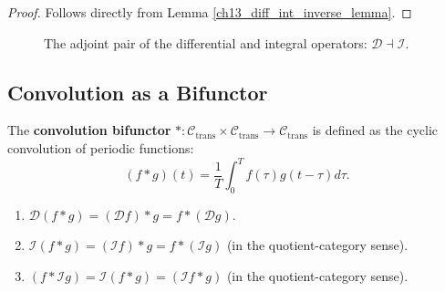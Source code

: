 \begin{proof}
Follows directly from Lemma \ref{ch13_diff_int_inverse_lemma}.
\end{proof}

\begin{figure}[htbp]
\centering
{}
\caption{The adjoint pair of the differential and integral operators: $\mathcal D\dashv\mathcal I$.}
\label{fig:diff_int_adjunction}
\end{figure}

\subsection{Convolution as a Bifunctor}

\begin{definition}\label{def:convolution_bifunctor}
The \textbf{convolution bifunctor} $*: \mathcal{C}_{\text{trans}} \times \mathcal{C}_{\text{trans}} \to \mathcal{C}_{\text{trans}}$ is defined as the cyclic convolution of periodic functions:
\[
(f * g)(t) = \frac{1}{T} \int_0^T f(\tau) g(t-\tau) d\tau.
\]
\end{definition}

\begin{proposition}\label{prop:convolution_diff_int}
\begin{enumerate}[label=(\roman*)]
    \item $\mathcal{D}(f * g) = (\mathcal{D}f) * g = f * (\mathcal{D}g)$.
    \item $\mathcal{I}(f * g) = (\mathcal{I}f) * g = f * (\mathcal{I}g)$ (in the quotient-category sense).
    \item $(f * \mathcal{I}g) = \mathcal{I}(f * g) = (\mathcal{I}f * g)$ (in the quotient-category sense).
\end{enumerate}
\end{proposition}


